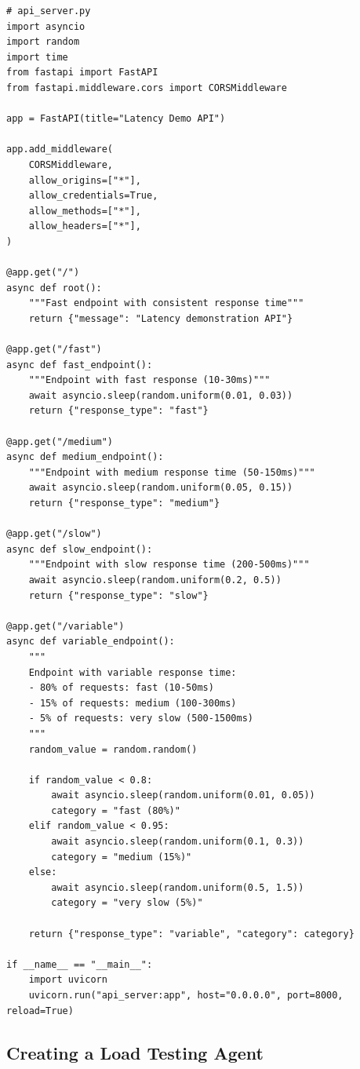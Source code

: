 \documentclass[12pt,letterpaper]{article}
\newenvironment{macterminal}{%
    \begin{mdframed}[
        linecolor=terminalFrame,
        backgroundcolor=terminalBg,
        roundcorner=5pt,
        skipabove=10pt,
        skipbelow=10pt,
        linewidth=1pt,
        innertopmargin=10pt, %
        frametitle={%
            \tikz[baseline=(current bounding box.east), outer sep=0pt]{
                \fill[red!80!black] (0,0) circle (5pt);
                \fill[yellow!80!black] (0.7,0) circle (5pt);
                \fill[green!70!black] (1.4,0) circle (5pt);
            }
        },
        frametitlealignment=\raggedright, %
        frametitleaboveskip=8pt, %
        frametitlebelowskip=0pt, %
    ]
}{%
    \end{mdframed}%
}
\begin{document}
\begin{macterminal}
\begin{lstlisting}
# api_server.py
import asyncio
import random
import time
from fastapi import FastAPI
from fastapi.middleware.cors import CORSMiddleware

app = FastAPI(title="Latency Demo API")

app.add_middleware(
    CORSMiddleware,
    allow_origins=["*"],
    allow_credentials=True,
    allow_methods=["*"],
    allow_headers=["*"],
)

@app.get("/")
async def root():
    """Fast endpoint with consistent response time"""
    return {"message": "Latency demonstration API"}

@app.get("/fast")
async def fast_endpoint():
    """Endpoint with fast response (10-30ms)"""
    await asyncio.sleep(random.uniform(0.01, 0.03))
    return {"response_type": "fast"}

@app.get("/medium")
async def medium_endpoint():
    """Endpoint with medium response time (50-150ms)"""
    await asyncio.sleep(random.uniform(0.05, 0.15))
    return {"response_type": "medium"}

@app.get("/slow")
async def slow_endpoint():
    """Endpoint with slow response time (200-500ms)"""
    await asyncio.sleep(random.uniform(0.2, 0.5))
    return {"response_type": "slow"}

@app.get("/variable")
async def variable_endpoint():
    """
    Endpoint with variable response time:
    - 80% of requests: fast (10-50ms)
    - 15% of requests: medium (100-300ms)
    - 5% of requests: very slow (500-1500ms)
    """
    random_value = random.random()
    
    if random_value < 0.8:
        await asyncio.sleep(random.uniform(0.01, 0.05))
        category = "fast (80%)"
    elif random_value < 0.95:
        await asyncio.sleep(random.uniform(0.1, 0.3))
        category = "medium (15%)"
    else:
        await asyncio.sleep(random.uniform(0.5, 1.5))
        category = "very slow (5%)"
    
    return {"response_type": "variable", "category": category}

if __name__ == "__main__":
    import uvicorn
    uvicorn.run("api_server:app", host="0.0.0.0", port=8000, reload=True)
\end{lstlisting}
\end{macterminal}

\subsection{Creating a Load Testing Agent}
\end{document}
